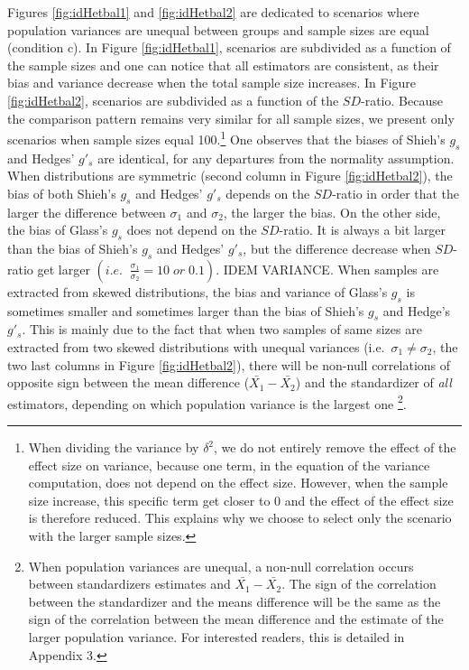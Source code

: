 \documentclass[
  man,floatsintext]{apa6}
\begin{document}
Figures \ref{fig:idHetbal1} and \ref{fig:idHetbal2} are dedicated to scenarios where population variances are unequal between groups and sample sizes are equal (condition c). In Figure \ref{fig:idHetbal1}, scenarios are subdivided as a function of the sample sizes and one can notice that all estimators are consistent, as their bias and variance decrease when the total sample size increases. In Figure \ref{fig:idHetbal2}, scenarios are subdivided as a function of the \(SD\)-ratio. Because the comparison pattern remains very similar for all sample sizes, we present only scenarios when sample sizes equal 100.\footnote{When dividing the variance by $\delta^2$, we do not entirely remove the effect of the effect size on variance, because one term, in the equation of the variance computation, does not depend on the effect size. However, when the sample size increase, this specific term get closer to 0 and the effect of the effect size is therefore reduced. This explains why we choose to select only the scenario with the larger sample sizes.} One observes that the biases of Shieh's \(g_s\) and Hedges' \(g'_s\) are identical, for any departures from the normality assumption. When distributions are symmetric (second column in Figure \ref{fig:idHetbal2}), the bias of both Shieh's \(g_s\) and Hedges' \(g'_s\) depends on the \(SD\)-ratio in order that the larger the difference between \(\sigma_1\) and \(\sigma_2\), the larger the bias. On the other side, the bias of Glass's \(g_s\) does not depend on the \(SD\)-ratio. It is always a bit larger than the bias of Shieh's \(g_s\) and Hedges' \(g'_s\), but the difference decrease when \(SD\)-ratio get larger \(\left(i.e. \; \;\frac{\sigma_1}{\sigma_2} = 10 \; or \; 0.1\right)\). IDEM VARIANCE. When samples are extracted from skewed distributions, the bias and variance of Glass's \(g_s\) is sometimes smaller and sometimes larger than the bias of Shieh's \(g_s\) and Hedge's \(g'_s\). This is mainly due to the fact that when two samples of same sizes are extracted from two skewed distributions with unequal variances (i.e.~\(\sigma_1 \neq\sigma_2\), the two last columns in Figure \ref{fig:idHetbal2}), there will be non-null correlations of opposite sign between the mean difference (\(\bar{X_1}-\bar{X_2}\)) and the standardizer of \emph{all} estimators, depending on which population variance is the largest one \footnote{When population variances are unequal, a non-null correlation occurs between standardizers estimates and $\bar{X_1}-\bar{X_2}$. The sign of the correlation between the standardizer and the means difference will be the same as the sign of the correlation between the mean difference and the estimate of the larger population variance. For interested readers, this is detailed in Appendix 3.}.
\end{document}
